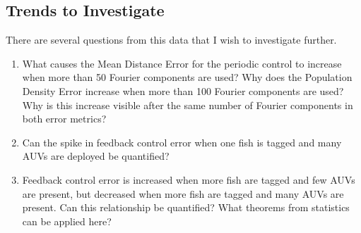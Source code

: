 \documentclass[11pt,letterpaper]{article}
\begin{document}
	\subsection{Trends to Investigate}
	
	There are several questions from this data that I wish to investigate further.
	\begin{enumerate}
		\item
		What causes the Mean Distance Error for the periodic control to increase when more than 50 Fourier components are used? Why does the Population Density Error increase when more than 100 Fourier components are used? Why is this increase visible after the same number of Fourier components in both error metrics?
		\item
		Can the spike in feedback control error when one fish is tagged and many AUVs are deployed be quantified?
		\item
		Feedback control error is increased when more fish are tagged and few AUVs are present, but decreased when more fish are tagged and many AUVs are present. Can this relationship be quantified? What theorems from statistics can be applied here? 
	\end{enumerate}
	

	
\end{document}
